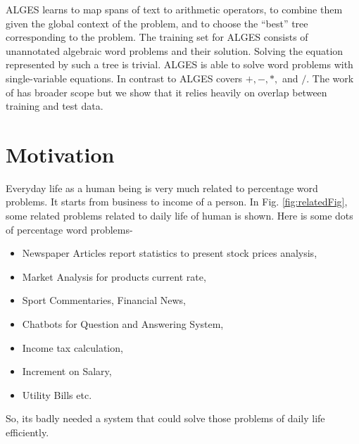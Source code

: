 \documentclass[document.tex]{subfiles}
\begin{document}
ALGES learns to map spans of text to arithmetic operators, to combine them given the global context of the problem, and to
choose the “best” tree corresponding to the problem.
The training set for ALGES consists of unannotated
algebraic word problems and their solution. Solving the equation represented by such a tree is trivial.
ALGES is able to solve word problems with single-variable equations.
In contrast to \cite{1} ALGES covers $ +, -, *, $ and $/$. The work of \cite{2} has broader scope but we show that it relies heavily on overlap between training and test data.

\section{Motivation}
Everyday life as a human being is very much related to percentage word problems. It starts from business to income of a person. In Fig. \ref{fig:relatedFig}, some related problems related to daily life of human is shown. Here is some dots of percentage word problems-
\begin{itemize}
	\item  Newspaper Articles report statistics to present stock prices analysis,
	\item  Market Analysis for products current rate,
	\item  Sport Commentaries, Financial News,
	\item  Chatbots for Question and Answering System,
	\item Income tax calculation,
	\item Increment on Salary,
	\item Utility Bills etc.
\end{itemize}
So, its badly needed a system that could solve those problems of daily life efficiently.
\end{document}
